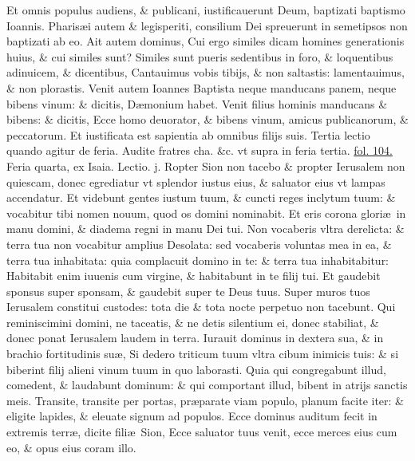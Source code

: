 \documentclass[a5paper,10pt]{book}
\def\rightmarginnote{%
	\lrmarginnote{\hskip\columnwidth \hskip -1em}}
\def\ae{æ}
\begin{document}
\begin{multicols*}{2}
Et omnis populus audiens, \& publicani, iustificauerunt Deum, baptizati baptismo Ioannis.
Pharis\ae i autem \& legisperiti, consilium Dei spreuerunt in semetipsos non baptizati ab eo.
Ait autem dominus, Cui ergo similes dicam homines generationis huius, \& cui similes sunt?
Similes sunt pueris sedentibus in foro, \& loquentibus adinuicem, \& dicentibus, Cantauimus vobis tibijs, \& non saltastis: lamentauimus, \& non plorastis.
Venit autem Ioannes Baptista neque manducans panem, neque bibens vinum: \& dicitis, D\ae monium habet.
Venit filius hominis manducans \& bibens: \& dicitis, Ecce homo deuorator, \& bibens vinum, amicus publicanorum, \& peccatorum.
Et iustificata est sapientia ab omnibus filijs suis.
\newline \color{red} Tertia lectio quando agitur de feria. \color{black} Audite fratres cha. \&c. \color{red} vt supra in feria tertia. \hyperlink{page.104}{fol. 104.} \color{black}
\newline {} \color{red} \hypertarget{WED-TERTIA-ADV}{Feria quarta,} ex Isaia. \hfill Lectio. j. \color{black}
\vspace{-.25em}
Ropter\rightmarginnote{c. 62.} Sion non tacebo \& propter Ierusalem non quiescam, donec egrediatur vt splendor
iustus eius, \& saluator eius vt lampas accendatur.
Et videbunt gentes iustum tuum, \& cuncti reges inclytum tuum: \& vocabitur tibi nomen nouum, quod os domini nominabit.
Et eris corona glori\ae \ in manu domini, \& diadema regni in manu Dei tui.
Non vocaberis vltra derelicta: \& terra tua non vocabitur amplius Desolata: sed vocaberis voluntas mea in ea, \& terra tua inhabitata: quia complacuit domino in te: \& terra tua inhabitabitur: Habitabit enim iuuenis cum virgine, \& habitabunt in te filij tui.
Et gaudebit sponsus super sponsam, \& gaudebit super te Deus tuus.
Super muros tuos Ierusalem constitui custodes: tota die \& tota nocte perpetuo non tacebunt.
Qui reminiscimini domini, ne taceatis, \& ne detis silentium ei, donec stabiliat, \& donec ponat Ierusalem laudem in terra.
Iurauit dominus in dextera sua, \& in brachio fortitudinis su\ae , Si dedero triticum tuum vltra cibum inimicis tuis: \& si biberint filij alieni vinum tuum in quo laborasti.
Quia qui congregabunt illud, comedent, \& laudabunt dominum: \& qui comportant illud, bibent in atrijs sanctis meis.
Transite, transite per portas, pr\ae parate viam populo, planum facite iter: \& eligite lapides, \& eleuate signum ad populos.
Ecce dominus auditum fecit in extremis terr\ae , dicite fili\ae \ Sion, Ecce saluator tuus venit, ecce merces eius cum eo, \& opus eius coram illo.

\end{multicols*}
\end{document}
